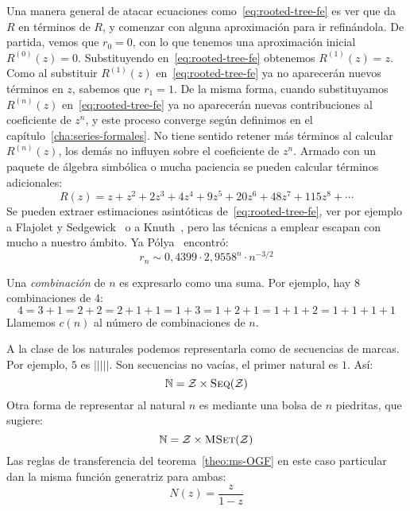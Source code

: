   Una manera general
  de atacar ecuaciones como~\eqref{eq:rooted-tree-fe}
  es ver que da \(R\) en términos de \(R\),
  y comenzar con alguna aproximación
  para ir refinándola.
  De partida,
  vemos que \(r_0 = 0\),
  con lo que tenemos una aproximación inicial \(R^{(0)}(z) = 0\).
  Substituyendo en~\eqref{eq:rooted-tree-fe}
  obtenemos \(R^{(1)}(z) = z\).
  Como al substituir \(R^{(1)}(z)\) en~\eqref{eq:rooted-tree-fe}
  ya no aparecerán nuevos términos en \(z\),
  sabemos que \(r_1 = 1\).
  De la misma forma,
  cuando substituyamos \(R^{(n)}(z)\) en~\eqref{eq:rooted-tree-fe}
  ya no aparecerán nuevas contribuciones al coeficiente de \(z^n\),
  y este proceso converge
  según definimos en el capítulo~\ref{cha:series-formales}.
  No tiene sentido retener más términos al calcular \(R^{(n)}(z)\),
  los demás no influyen sobre el coeficiente de \(z^n\).
  Armado con un paquete de álgebra simbólica%
  o mucha paciencia
  se pueden calcular términos adicionales:
  \begin{equation}
    \label{eq:rooted-tree-gf}
    R(z)
      = z + z^2 + 2 z^3 + 4 z^4 + 9 z^5 + 20 z^6 + 48 z^7
	  + 115 z^8 + \dotsb
  \end{equation}
  Se pueden extraer estimaciones asintóticas
  de~\eqref{eq:rooted-tree-fe},
  ver por ejemplo a Flajolet y Sedgewick~%
    \cite{flajolet09:_analy_combin}
  o a Knuth~\cite{knuth11:_combin_alg_1},
  pero las técnicas a emplear escapan con mucho a nuestro ámbito.
  Ya Pólya~%
    \cite{polya87:_combin_enumer_group_graph_chemic_compoun}
  encontró:
  \begin{equation*}
    r_n
     \sim 0,4399 \cdot 2,9558^n \cdot n^{- 3 / 2}
  \end{equation*}

  Una \emph{combinación} de \(n\) es expresarlo como una suma.%
  Por ejemplo,
  hay \(8\) combinaciones de \(4\):
  \begin{equation*}
      4
	= 3 + 1
	= 2 + 2
	= 2 + 1 + 1
	= 1 + 3
	= 1 + 2 + 1
	= 1 + 1 + 2
	= 1 + 1 + 1 + 1
  \end{equation*}
  Llamemos \(c(n)\) al número de combinaciones de \(n\).

  A la clase de los naturales
  podemos representarla como de secuencias de marcas.
  Por ejemplo, \(5\) es \(|||||\).
  Son secuencias no vacías,
  el primer natural es \(1\).
  Así:
  \begin{equation*}
    \mathbb{N}
      = \mathcal{Z} \times \operatorname{\textsc{Seq}}(\mathcal{Z})
  \end{equation*}
  Otra forma de representar al natural \(n\)
  es mediante una bolsa de \(n\) piedritas,
  que sugiere:
  \begin{equation*}
    \mathbb{N}
      = \mathcal{Z} \times \operatorname{\textsc{MSet}}(\mathcal{Z})
  \end{equation*}
  Las reglas de transferencia del teorema~\ref{theo:ms-OGF}
  en este caso particular
  dan la misma función generatriz para ambas:
  \begin{equation*}
    N(z)
      = \frac{z}{1 - z}
  \end{equation*}

